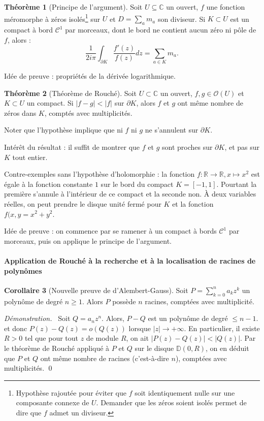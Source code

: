 \documentclass[11pt,a4paper]{book}
\newcommand{\D}{\mathbb{D}}
\newcommand{\R}{\mathbb{R}}
\newcommand{\C}{\mathbb{C}}
\theoremstyle{definition}
\newtheorem{theoreme}{Th\'eor\`eme}[section]
\newtheorem{corollaire}[theoreme]{Corollaire}
\renewenvironment{proof}{\color{preuve}\emph{Démonstration.~}}{\qed}
\theoremstyle{plain}
\begin{document}
\begin{theoreme}[Principe de l'argument]
Soit $U\subseteq \C$ un ouvert, $f$ une fonction méromorphe à zéros isolés\footnote{Hypothèse rajoutée pour éviter que $f$ soit identiquement nulle sur une composante connexe de $U$. Demander que les zéros soient isolés permet de dire que $f$ admet un diviseur.} sur $U$ et $D = \sum_a m_a$ son diviseur.
Si $K\subset U$ est un compact à bord $\mathcal C^1$ par morceaux, dont le bord ne contient aucun zéro ni pôle de $f$, alors :
\[ \frac{1}{2i\pi} \int_{\partial K} \frac{f'(z)}{f(z)}dz = \sum_{a \in K} m_a.\]
\end{theoreme}

Idée de preuve : propriétés de la dérivée logarithmique.

\begin{theoreme}[Théorème de Rouché]
Soit $U\subset \C$ un ouvert, $f, g\in \mathcal O(U)$ et $K\subset U$ un compact.
Si $|f-g| < |f|$ sur $\partial K$, alors $f$ et $g$ ont même nombre de zéros dans $K$, comptés avec multiplicités.
\end{theoreme}

Noter que l'hypothèse implique que ni $f$ ni $g$ ne s'annulent sur $\partial K$.

Intérêt du résultat : il suffit de montrer que $f$ et $g$ sont \og proches\fg{} sur $\partial K$, et pas sur $K$ tout entier. 

Contre-exemples sans l'hypothèse d'holomorphie : la fonction $f : \R \to \R, x\mapsto x^2$ est égale à la fonction constante $1$ sur le bord du compact $K=[-1,1]$. Pourtant la première s'annule à l'intérieur de ce compact et la seconde non.  À deux variables réelles, on peut prendre le disque unité fermé pour $K$ et la fonction $f(x,y=x^2+y^2$. 

Idée de preuve : on commence par se ramener à un compact à bords $\mathcal C^1$ par morceaux, puis on applique le principe de l'argument.


\paragraph{Application de Rouché à la recherche et à la localisation de racines de polynômes}

\begin{corollaire}[Nouvelle preuve de d'Alembert-Gauss]
Soit $P = \sum_{k=0}^n a_kz^k$ un polynôme de degré $n\geq 1$.
Alors $P$ possède $n$ racines, comptées avec multiplicité.
\end{corollaire}
\begin{proof}
Soit $Q=a_nz^n$. Alors, $P-Q$ est un polynôme de degré $\leq n-1$. et donc $P(z)-Q(z) = o(Q(z))$ lorsque $|z|\to +\infty$.
En particulier, il existe $R>0$ tel que pour tout $z$ de module $R$, on ait  $|P(z)-Q(z)| < |Q(z)|$.
Par le théorème de Rouché appliqué à $P$ et $Q$ sur le disque $\D(0,R)$, on en déduit que $P$ et $Q$ ont même nombre de racines (c'est-à-dire $n$), comptées avec multiplicités.
\end{proof}
\end{document}
